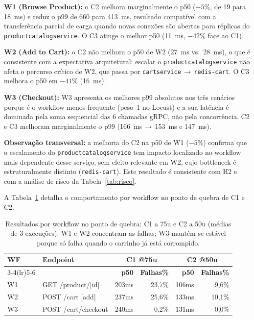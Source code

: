 \documentclass[manuscript,oneside]{acmart}
\begin{document}
\textbf{W1 (Browse Product):} o C2 melhora marginalmente o p50 ($-5\%$, de 19 para 18~ms) e reduz o p99 de 660 para 413~ms, resultado compatível com a transferência parcial de carga quando novas conexões são abertas para réplicas do \texttt{productcatalogservice}. O C3 atinge o melhor p50 (11~ms, $-42\%$ face ao C1).

\textbf{W2 (Add to Cart):} o C2 não melhora o p50 de W2 (27~ms vs.\ 28~ms), o que é consistente com a expectativa arquitetural: escalar o \texttt{productcatalogservice} não afeta o percurso crítico de W2, que passa por \texttt{cartservice}\,$\to$\,\texttt{redis-cart}. O C3 melhora o p50 em $-41\%$ (16~ms).

\textbf{W3 (Checkout):} W3 apresenta os melhores p99 absolutos nos três cenários porque é o workflow menos frequente (peso~1 no Locust) e a sua latência é dominada pela soma sequencial das 6 chamadas gRPC, não pela concorrência. C2 e C3 melhoram marginalmente o p99 (166~ms\,$\to$\,153~ms e 147~ms).

\textbf{Observação transversal:} a melhoria do C2 na p50 de W1 ($-5\%$) confirma que o escalamento do \texttt{productcatalogservice} tem impacto localizado no workflow mais dependente desse serviço, sem efeito relevante em W2, cujo bottleneck é estruturalmente distinto (\texttt{redis-cart}). Este resultado é consistente com H2 e com a análise de risco da Tabela~\ref{tab:risco}.

A Tabela~\ref{tab:por-workflow-quebra} detalha o comportamento por workflow no ponto de quebra de C1 e C2.

\begin{table}[H]
\caption{Resultados por workflow no ponto de quebra: C1 a 75u e C2 a 50u (médias de 3 execuções). W1 e W2 concentram as falhas; W3 mantém-se estável porque só falha quando o carrinho já está corrompido.}
\label{tab:por-workflow-quebra}
\begin{tabularx}{\columnwidth}{llrrrr}
\toprule
\textbf{WF} & \textbf{Endpoint} & \multicolumn{2}{c}{\textbf{C1 @75u}} & \multicolumn{2}{c}{\textbf{C2 @50u}} \\
\cmidrule(lr){3-4}\cmidrule(lr){5-6}
 & & \textbf{p50} & \textbf{Falhas\%} & \textbf{p50} & \textbf{Falhas\%} \\
\midrule
W1 & GET /product/[id]   & 203ms & 23,7\% & 106ms & 9,6\% \\
W2 & POST /cart [add]    & 237ms & 25,6\% & 133ms & 10,1\% \\
W3 & POST /cart/checkout & 240ms & 0,2\%  & 131ms & 0,0\% \\
\bottomrule
\end{tabularx}
\end{table}
\end{document}

